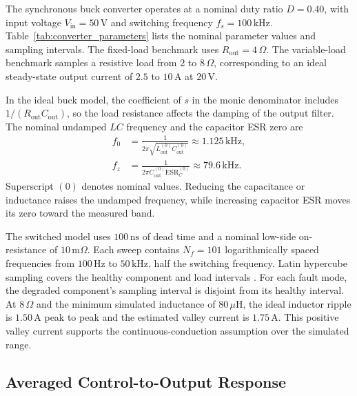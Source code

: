 \documentclass[journal]{IEEEtran}
\begin{document}
The synchronous buck converter operates at a nominal duty ratio $D=0.40$, with input voltage $V_{\mathrm{in}}=50\,\mathrm{V}$ and switching frequency $f_s=100\,\mathrm{kHz}$. Table~\ref{tab:converter_parameters} lists the nominal parameter values and sampling intervals. The fixed-load benchmark uses $R_{\mathrm{out}}=4\,\Omega$. The variable-load benchmark samples a resistive load from $2$ to $8\,\Omega$, corresponding to an ideal steady-state output current of $2.5$ to $10\,\mathrm{A}$ at $20\,\mathrm{V}$.



In the ideal buck model, the coefficient of $s$ in the monic denominator includes $1/(R_{\mathrm{out}} C_{\mathrm{out}})$, so the load resistance affects the damping of the output filter. The nominal undamped $LC$ frequency and the capacitor ESR zero are
\begin{align}
f_0 &= \frac{1}{2\pi\sqrt{L_{\mathrm{out}}^{(0)}C_{\mathrm{out}}^{(0)}}}
       \approx 1.125\,\mathrm{kHz}, \label{eq:resonance}\\
f_z &= \frac{1}{2\pi C_{\mathrm{out}}^{(0)}\mathrm{ESR}_C^{(0)}}
       \approx 79.6\,\mathrm{kHz}.
\end{align}
Superscript $(0)$ denotes nominal values. Reducing the capacitance or inductance raises the undamped frequency, while increasing capacitor ESR moves its zero toward the measured band.

The switched model uses $100\,\mathrm{ns}$ of dead time and a nominal low-side on-resistance of $10\,\mathrm{m}\Omega$. Each sweep contains $N_f=101$ logarithmically spaced frequencies from $100\,\mathrm{Hz}$ to $50\,\mathrm{kHz}$, half the switching frequency. Latin hypercube sampling covers the healthy component and load intervals \cite{mckay1979comparison}. For each fault mode, the degraded component's sampling interval is disjoint from its healthy interval. At $8\,\Omega$ and the minimum simulated inductance of $80\,\mu\mathrm{H}$, the ideal inductor ripple is $1.50\,\mathrm{A}$ peak to peak and the estimated valley current is $1.75\,\mathrm{A}$. This positive valley current supports the continuous-conduction assumption over the simulated range.

\subsection{Averaged Control-to-Output Response}\label{sec:3_2}
\end{document}
